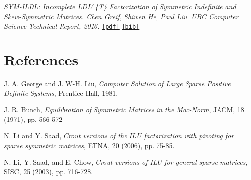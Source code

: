 {\itshape  S\+Y\+M-\/\+I\+L\+DL\+: Incomplete L\+D\+L$^\wedge$\{T\} Factorization of Symmetric Indefinite and Skew-\/\+Symmetric Matrices. Chen Greif, Shiwen He, Paul Liu. U\+BC Computer Science Technical Report, 2016. } \href{http://arxiv.org/pdf/1505.07589v1}{\tt \mbox{[}pdf\mbox{]}} \href{http://dblp.uni-trier.de/rec/bibtex/journals/corr/GreifHL15}{\tt \mbox{[}bib\mbox{]}}\hypertarget{index_refs}{}\section{References}\label{index_refs}

\begin{DoxyEnumerate}
\item J. A. George and J. W-\/H. Liu, {\itshape Computer Solution of Large Sparse Positive Definite Systems}, Prentice-\/\+Hall, 1981.
\item J. R. Bunch, {\itshape Equilibration of Symmetric Matrices in the Max-\/\+Norm}, J\+A\+CM, 18 (1971), pp. 566-\/572.
\item N. Li and Y. Saad, {\itshape Crout versions of the I\+LU factorization with pivoting for sparse symmetric matrices}, E\+T\+NA, 20 (2006), pp. 75-\/85.
\item N. Li, Y. Saad, and E. Chow, {\itshape Crout versions of I\+LU for general sparse matrices}, S\+I\+SC, 25 (2003), pp. 716-\/728. 
\end{DoxyEnumerate}